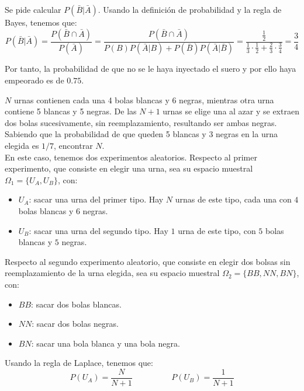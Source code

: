 \begin{ejercicio}
    Se pide calcular $P(\bar{B}|\bar{A})$. Usando la definición de probabilidad y la regla de Bayes, tenemos que:
    \begin{equation*}
        P(\bar{B}|\bar{A}) = \frac{P(\bar{B}\cap\bar{A})}{P(\bar{A})}
        = \frac{P(\bar{B}\cap\bar{A})}{P(B)P(\bar{A}|B) + P(\bar{B})P(\bar{A}|\bar{B})} = \frac{\frac{1}{2}}{\frac{1}{3}\cdot \frac{1}{2} + \frac{2}{3}\cdot \frac{3}{4}} = \frac{3}{4}
    \end{equation*}

    Por tanto, la probabilidad de que no se le haya inyectado el suero y por ello haya empeorado es de $0.75$.
\end{ejercicio}

\begin{ejercicio} \label{ej:4.Ejercicio9}
    $N$ urnas contienen cada una 4 bolas blancas y 6 negras, mientras otra urna contiene 5 blancas y 5 negras. De las $N + 1$ urnas se elige una al azar y se extraen dos bolas sucesivamente, sin reemplazamiento, resultando ser ambas negras. Sabiendo que la probabilidad de que queden 5 blancas y 3 negras en la urna elegida es $1/7$, encontrar $N$.\\

    En este caso, tenemos dos experimentos aleatorios. Respecto al primer experimento, que consiste en elegir una urna, sea su espacio muestral $\Omega_1 = \{U_A, U_B\}$, con:
    \begin{itemize}
        \item $U_A$: sacar una urna del primer tipo. Hay $N$ urnas de este tipo, cada una con $4$ bolas blancas y $6$ negras.
        \item $U_B$: sacar una urna del segundo tipo. Hay $1$ urna de este tipo, con $5$ bolas blancas y $5$ negras.
    \end{itemize}

    Respecto al segundo experimento aleatorio, que consiste en elegir dos bolsas sin reemplazamiento de la urna elegida, sea su espacio muestral $\Omega_2 = \{BB, NN, BN\}$, con:
    \begin{itemize}
        \item $BB$: sacar dos bolas blancas.
        \item $NN$: sacar dos bolas negras.
        \item $BN$: sacar una bola blanca y una bola negra.
    \end{itemize}

    Usando la regla de Laplace, tenemos que:
    \begin{equation*}
        P(U_A) = \frac{N}{N+1} \hspace{2cm} P(U_B) = \frac{1}{N+1}
    \end{equation*}


\end{ejercicio}
